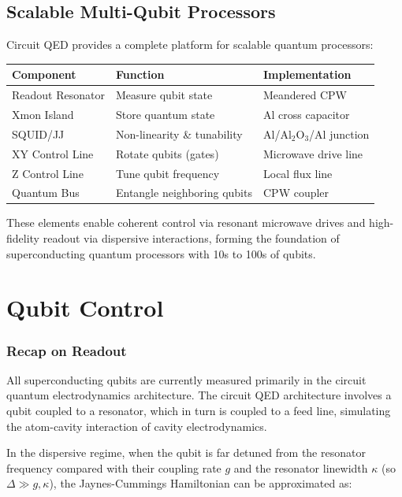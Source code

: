 \documentclass{article}
\begin{document}
\subsection{Scalable Multi-Qubit Processors}

Circuit QED provides a complete platform for scalable quantum processors:

\begin{center}
\begin{tabular}{lll}
\hline
\textbf{Component} & \textbf{Function} & \textbf{Implementation} \\
\hline
Readout Resonator & Measure qubit state & Meandered CPW \\
Xmon Island & Store quantum state & Al cross capacitor \\
SQUID/JJ & Non-linearity \& tunability & Al/$\text{Al}_2\text{O}_3$/Al junction \\
XY Control Line & Rotate qubits (gates) & Microwave drive line \\
Z Control Line & Tune qubit frequency & Local flux line \\
Quantum Bus & Entangle neighboring qubits & CPW coupler \\
\hline
\end{tabular}
\end{center}

These elements enable coherent control via resonant microwave drives and high-fidelity readout via dispersive interactions, forming the foundation of superconducting quantum processors with 10s to 100s of qubits.

\newpage
\section{Qubit Control}
\subsubsection*{Recap on Readout}

All superconducting qubits are currently measured primarily in the circuit quantum electrodynamics architecture. The circuit QED architecture involves a qubit coupled to a resonator, which in turn is coupled to a feed line, simulating the atom-cavity interaction of cavity electrodynamics.

In the dispersive regime, when the qubit is far detuned from the resonator frequency compared with their coupling rate $g$ and the resonator linewidth $\kappa$ (so $\Delta \gg g, \kappa$), the Jaynes-Cummings Hamiltonian can be approximated as:
\end{document}
